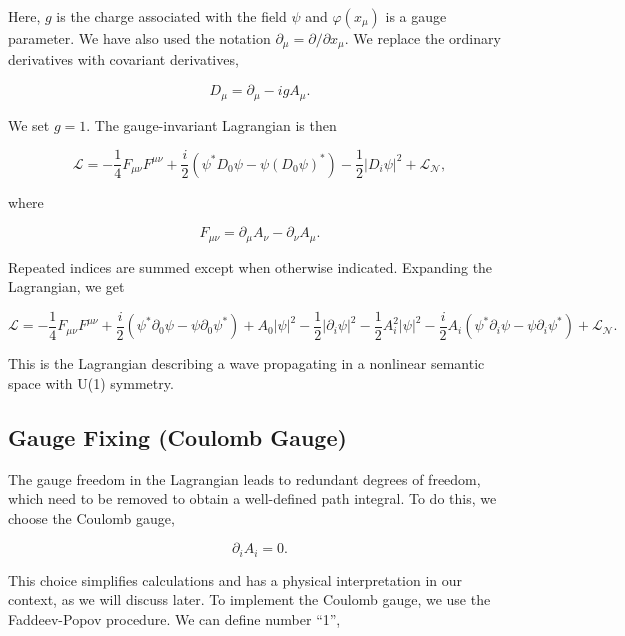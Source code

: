 \documentclass[prd,amsmath,amssymb,12pt]{revtex4}
\begin{document}
\noindent
Here, $g$ is the charge associated with the field $\psi$ and $\varphi(x_{\mu})$ is a gauge parameter. We have also used
the notation $\partial_{\mu} = \partial/\partial x_{\mu}$.
We replace the ordinary derivatives with covariant derivatives,

\begin{equation}
  D_{\mu}  = \partial_{\mu} - igA_{\mu}.
\end{equation}

\noindent
We set $g=1$.
The gauge-invariant Lagrangian is then

\begin{equation}
    \mathcal{L} = -\frac{1}{4}F_{\mu\nu} F^{\mu\nu}+ \frac{i}{2}(\psi^* D_0 \psi - \psi (D_0 \psi)^*)
    - \frac{1}{2} |D_i \psi|^2 +\mathcal{L_{N}},
\end{equation}

\noindent
where

\begin{equation}
    F_{\mu\nu} = \partial_\mu A_\nu - \partial_\nu A_\mu.
\end{equation}

\noindent
Repeated indices are summed except when otherwise indicated. Expanding the Lagrangian, we get

\begin{equation}
  \mathcal{L} = -\frac{1}{4}F_{\mu\nu} F^{\mu\nu}+ \frac{i}{2} ( \psi^* \partial_0 \psi
  - \psi \partial_0\psi^* ) + A_0 |\psi|^2
  - \frac{1}{2}  |\partial_i \psi|^2 - \frac{1}{2}  A_i^2 |\psi|^2
  - \frac{i}{2}  A_i (\psi^* \partial_i \psi - \psi \partial_i \psi^*) +\mathcal{L_{N}}.
  \label{eq_lagrangian}
\end{equation}

\noindent
This is the Lagrangian describing a wave propagating in a nonlinear semantic space with U(1) symmetry.

\subsection{Gauge Fixing (Coulomb Gauge)}

The gauge freedom in the Lagrangian leads to redundant degrees of freedom, which need to be removed to
obtain a well-defined path integral. To do this, we choose the Coulomb gauge,

\begin{equation}
 \partial_i A_i = 0.
\end{equation}

\noindent
This choice simplifies calculations and has a physical interpretation in our context, as we will discuss later.
To implement the Coulomb gauge, we use the Faddeev-Popov procedure. We can define number ``1'',
\end{document}
